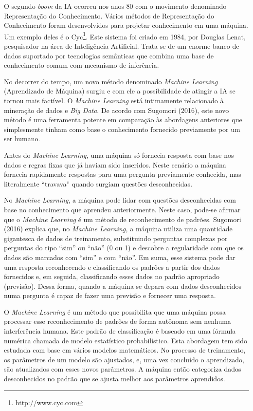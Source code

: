O segundo \emph{boom} da IA ocorreu nos anos 80 com o movimento
denominado Representação do Conhecimento. Vários métodos de
Representação do Conhecimento foram desenvolvidos para projetar
conhecimento em uma máquina. Um exemplo deles é o Cyc\footnote{http://www.cyc.com}.
Este sistema foi criado em 1984, por Douglas Lenat, pesquisador na área
de Inteligência Artificial. Trata-se de um enorme banco de dados
suportado por tecnologias semânticas que combina uma base de
conhecimento comum com mecanismo de inferência.

No decorrer do tempo, um novo método denominado \emph{Machine Learning}
(Aprendizado de Máquina) surgiu e com ele a possibilidade de atingir a
IA se tornou mais factível. O \emph{Machine Learning} está intimamente
relacionado à mineração de dados e \emph{Big Data}. De acordo com
Sugomori (2016), este novo método é uma ferramenta potente em comparação
às abordagens anteriores que simplesmente tinham como base o
conhecimento fornecido previamente por um ser humano.

Antes do \emph{Machine Learning,} uma máquina só fornecia resposta com
base nos dados e regras fixas que já haviam sido inseridos. Neste
cenário a máquina fornecia rapidamente respostas para uma pergunta
previamente conhecida, mas literalmente ``travava'' quando surgiam
questões desconhecidas.

No \emph{Machine Learning}, a máquina pode lidar com questões
desconhecidas com base no conhecimento que aprendeu anteriormente. Neste
caso, pode-se afirmar que o \emph{Machine Learning} é um método de
reconhecimento de padrões. Sugomori (2016) explica que, no \emph{Machine
Learning,} a máquina utiliza uma quantidade gigantesca de dados de
treinamento, substituindo perguntas complexas por perguntas do tipo
``sim'' ou ``não'' (0 ou 1) e descobre a regularidade com que os dados
são marcados com ``sim'' e com ``não''. Em suma, esse sistema pode dar
uma resposta reconhecendo e classificando os padrões a partir dos dados
fornecidos e, em seguida, classificando esses dados no padrão apropriado
(previsão). Dessa forma, quando a máquina se depara com dados
desconhecidos numa pergunta é capaz de fazer uma previsão e fornecer uma
resposta.

O \emph{Machine Learning} é um método que possibilita que uma máquina
possa processar esse reconhecimento de padrões de forma autônoma sem
nenhuma interferência humana. Este padrão de classificação é baseado em
uma fórmula numérica chamada de modelo estatístico probabilístico. Esta
abordagem tem sido estudada com base em vários modelos matemáticos. No
processo de treinamento, os parâmetros de um modelo são ajustados, e,
uma vez concluído o aprendizado, são atualizados com esses novos
parâmetros. A máquina então categoriza dados desconhecidos no padrão que
se ajusta melhor aos parâmetros aprendidos.

